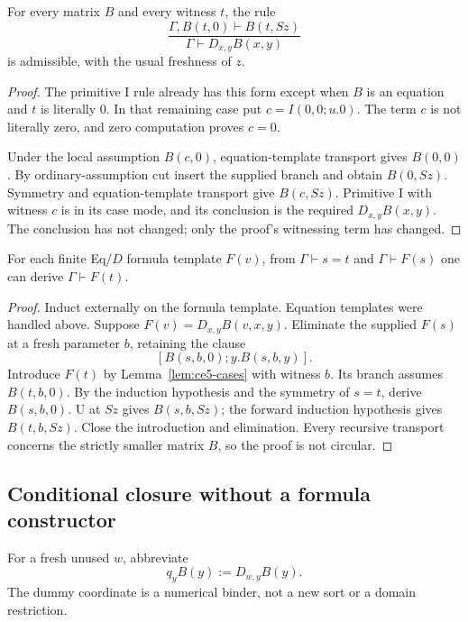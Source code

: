 \begin{lemma}
\label{lem:ce5-cases}
For every matrix $B$ and every witness $t$, the rule
\[
 \frac{\Gamma,B(t,0)\vdash B(t,Sz)}
      {\Gamma\vdash D_{x,y}B(x,y)}
\]
is admissible, with the usual freshness of $z$.
\end{lemma}
\begin{proof}
The primitive I rule already has this form except when $B$ is an
equation and $t$ is literally $0$. In that remaining case put
$c=I(0,0;u.0)$. The term $c$ is not literally zero, and zero computation
proves $c=0$.

Under the local assumption $B(c,0)$, equation-template transport gives
$B(0,0)$. By ordinary-assumption cut insert the supplied branch and
obtain $B(0,Sz)$. Symmetry and equation-template transport give
$B(c,Sz)$. Primitive I with witness $c$ is in its case mode, and its
conclusion is the required $D_{x,y}B(x,y)$. The conclusion has not
changed; only the proof's witnessing term has changed.
\end{proof}

\begin{lemma}
\label{lem:ce5-formula-transport}
For each finite Eq/$D$ formula template $F(v)$, from
$\Gamma\vdash s=t$ and $\Gamma\vdash F(s)$ one can derive
$\Gamma\vdash F(t)$.
\end{lemma}
\begin{proof}
Induct externally on the formula template. Equation templates were
handled above. Suppose
$F(v)=D_{x,y}B(v,x,y)$. Eliminate the supplied $F(s)$ at a fresh
parameter $b$, retaining the clause
\[
 [B(s,b,0);y.B(s,b,y)].
\]
Introduce $F(t)$ by Lemma~\ref{lem:ce5-cases} with witness $b$.
Its branch assumes $B(t,b,0)$. By the induction hypothesis and the
symmetry of $s=t$, derive $B(s,b,0)$. U at $Sz$ gives
$B(s,b,Sz)$; the forward induction hypothesis gives $B(t,b,Sz)$.
Close the introduction and elimination. Every recursive transport
concerns the strictly smaller matrix $B$, so the proof is not circular.
\end{proof}

\subsection{Conditional closure without a formula constructor}

For a fresh unused $w$, abbreviate
\[
 q_yB(y):=D_{w,y}B(y).
\]
The dummy coordinate is a numerical binder, not a new sort or a domain
restriction.


